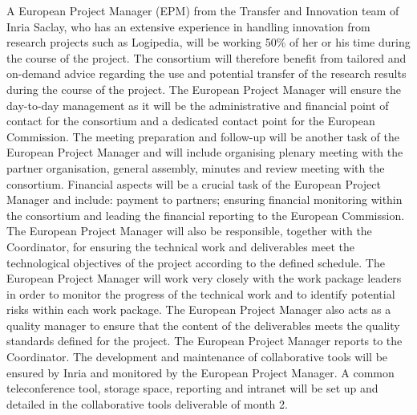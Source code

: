 \begin{workpackage}[id=management,type=MGT,wphases=1-48,
  short=Management,
  title=Management,
  lead=Inr,InrRM=34,InnRM=2,SacRM=2,TumRM=2,LieRM=2,BelRM=2,DelRM=2,FauRM=2]
\begin{tasklist}
\begin{task}[id=admin,title=Administrative and Financial Management,shorttitle=Adm.\&Fin.,lead=Inr,InrRM=10,wphases=1-48]
    A European Project Manager (EPM) from the Transfer and Innovation
    team of Inria Saclay, who has an extensive experience in handling
    innovation from research projects such as Logipedia, will be working
    50\% of her or his time during the course of the project.
     The
    consortium will therefore benefit from tailored and on-demand
    advice regarding the use and potential transfer of the research
    results during the course of the project.  The European Project Manager will ensure the
    day-to-day management as it will be the administrative and
    financial point of contact for the consortium and a dedicated
    contact point for the European Commission. The meeting preparation
    and follow-up will be another task of the European Project Manager and will include
    organising plenary meeting with the partner organisation, general
    assembly, minutes and review meeting with the consortium. Financial
    aspects will be a crucial task of the European Project Manager and include: payment to
    partners; ensuring financial monitoring within the consortium and
    leading the financial reporting to the European Commission.  The
    European Project Manager will also be responsible, together with the 
    Coordinator, for ensuring the technical work and deliverables meet
    the technological objectives of the project according to the
    defined schedule. The European Project Manager will work very closely with the work
    package leaders in order to monitor the progress of the technical
    work and to identify potential risks within each work package.
    The European Project Manager also
    acts as a quality manager to ensure that the content of the
    deliverables meets the quality standards defined for the
    project. The European Project Manager reports to the Coordinator.  The
    development and maintenance of collaborative tools will be ensured
    by Inria and monitored by the European Project Manager. A common teleconference tool,
    storage space, reporting and intranet will be set up and detailed
    in the collaborative tools deliverable of month 2.
  \end{task}


\end{tasklist}
\end{workpackage}
